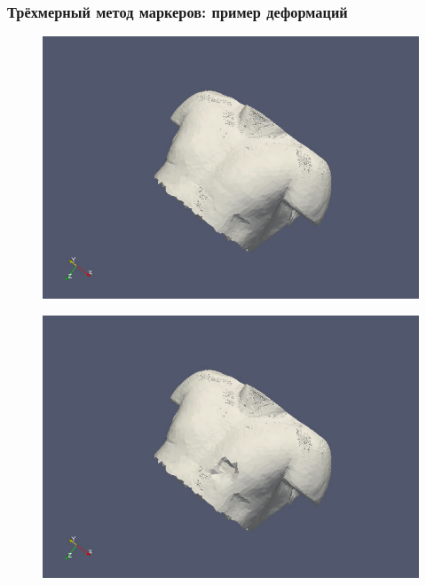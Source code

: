 \documentclass[xcolor={usenames,dvipsnames,svgnames,table}]{beamer}
\begin{document}
\begin{frame}
    \frametitle{Трёхмерный метод маркеров: пример деформаций}
    \begin{center}
        \begin{minipage}[h]{0.47\textwidth}
            \begin{figure}[h]
                \includegraphics[width=\textwidth]{png/corpse/image1.png}
            \end{figure}
        \end{minipage}
        \begin{minipage}[h]{0.47\textwidth}
            \begin{figure}[h]
                \includegraphics[width=\textwidth]{png/corpse/image2.png}
            \end{figure}
        \end{minipage}

\end{center}
\end{frame}
\end{document}
